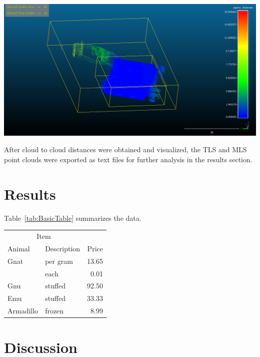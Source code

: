 \documentclass[man]{apa7}
\begin{document}
\begin{minipage}{\linewidth}
  \includegraphics[height=\textheight/2 ,width=\textwidth/1]{figures/noMaxDistance.png}
  \label{fig:nomaxdistance}
\end{minipage}

After cloud to cloud distances were obtained and visualized, the TLS and MLS point clouds were exported as text files for further analysis in the results section. 

\section{Results}
Table~\ref{tab:BasicTable} summarizes the data. \lipsum[1-3]
\vspace{20pt}

\begin{minipage}{\linewidth}
  \label{tab:BasicTable}
  \begin{tabular}{@{}llr@{}}         \toprule
  \multicolumn{2}{c}{Item}        \\ \cmidrule(r){1-2}
  Animal    & Description & Price \\ \midrule
  Gnat      & per gram    & 13.65 \\
            & each        &  0.01 \\
  Gnu       & stuffed     & 92.50 \\
  Emu       & stuffed     & 33.33 \\
  Armadillo & frozen      &  8.99 \\ \bottomrule
  \end{tabular}
\end{minipage}


\section{Discussion}

\printbibliography
\end{document}

